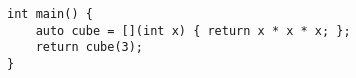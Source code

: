 \begin{lstlisting}[title=\href{https://godbolt.org/z/zBE2_n}{\texttt{godbolt.org/z/zBE2\_n}}]
int main() { 
    auto cube = [](int x) { return x * x * x; };
    return cube(3);
}
\end{lstlisting}
